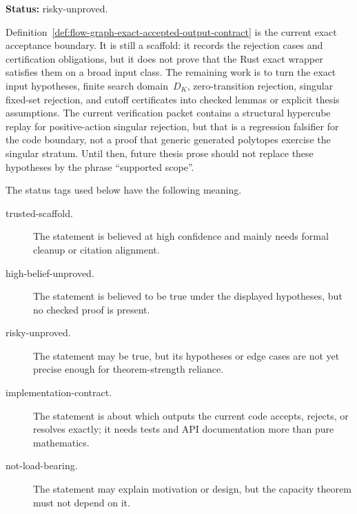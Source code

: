 \begin{unverified}
\begin{remark}%
\label{rem:fg-pr-supported-input-contract}
\textbf{Status:} risky-unproved.

Definition~\ref{def:flow-graph-exact-accepted-output-contract} is the current
exact acceptance boundary.  It is still a scaffold: it records the rejection
cases and certification obligations, but it does not prove that the Rust exact
wrapper satisfies them on a broad input class.  The remaining work is to turn
the exact input hypotheses, finite search domain~$D_K$, zero-transition
rejection, singular fixed-set rejection, and cutoff certificates into checked
lemmas or explicit thesis assumptions.  The current
verification packet contains a structural hypercube replay for positive-action
singular rejection, but that is a regression falsifier for the code boundary,
not a proof that generic generated polytopes exercise the singular stratum.
Until then, future thesis prose should not replace these hypotheses by the
phrase ``supported scope''.
\end{remark}
\end{unverified}

\begin{unverified}
\begin{definition}\label{def:flow-graph-proof-risk-status}
The status tags used below have the following meaning.
\begin{description}
  \item[trusted-scaffold.]
    The statement is believed at high confidence and mainly needs formal
    cleanup or citation alignment.
  \item[high-belief-unproved.]
    The statement is believed to be true under the displayed hypotheses, but no
    checked proof is present.
  \item[risky-unproved.]
    The statement may be true, but its hypotheses or edge cases are not yet
    precise enough for theorem-strength reliance.
  \item[implementation-contract.]
    The statement is about which outputs the current code accepts, rejects, or
    resolves exactly; it needs tests and API documentation more than pure
    mathematics.
  \item[not-load-bearing.]
    The statement may explain motivation or design, but the capacity theorem
    must not depend on it.
\end{description}
\end{definition}
\end{unverified}

